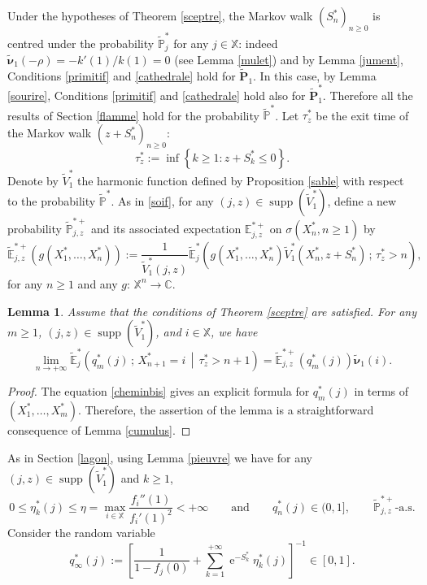 \documentclass[12pt]{amsart}
\newtheorem{lemma}[theorem]{Lemma}
\theoremstyle{definition}
\numberwithin{equation}{section}
\newcommand*{\sachant}[2]{\left.#1 \,\middle|\,#2\right.}
\def\bb#1{\mathbb{#1}}
\def\tt#1{\tilde{#1}}
\def\tbf#1{\tilde{\mathbf{#1}}}
\def\tbs#1{\tilde{\boldsymbol{#1}}}
\def\tbb#1{\tilde{\mathbb{#1}}}
\def\geq{\geqslant}
\def\leq{\leqslant}
\DeclareMathOperator{\e}{e}
\DeclareMathOperator{\supp}{supp}
\begin{document}
Under the hypotheses of Theorem \ref{sceptre}, the Markov walk $( S_n^* )_{n\geq 0}$ is centred under the probability $\tbb P_j^*$ for any $j \in \bb X$: indeed $\tbs \nu_1 (-\rho) = -k'(1)/k(1) = 0$ (see Lemma \ref{mulet}) and by Lemma \ref{jument}, Conditions \ref{primitif} and \ref{cathedrale} hold for $\tbf P_1$. In this case, by Lemma \ref{sourire}, Conditions \ref{primitif} and \ref{cathedrale} hold also for $\tbf P_1^*$. Therefore all the results of Section \ref{flamme} hold for the probability $\tbb P^*$. Let $\tau_z^*$ be the exit time of the Markov walk $( z+S_n^* )_{n\geq 0}$:
\[
\tau_z^* := \inf \left\{ k \geq 1 : z+S_k^* \leq 0 \right\}.
\]
Denote by $\tt V_1^*$ the harmonic function defined by Proposition \ref{sable} with respect to the probability $\tbb P^*$. 
As in \eqref{soif}, for any $(j,z) \in \supp(\tt V_1^*)$, define a new probability $\tbb P_{j,z}^{*+}$ and its associated expectation $\bb E_{j,z}^{*+}$ on $\sigma\left( X_n^*, n \geq 1 \right)$ by
\[
\tbb E_{j,z}^{*+} \left( g \left( X_1^*, \dots, X_n^* \right) \right) := \frac{1}{\tt V_1^*(j,z)} \tbb E_j^* \left( g\left( X_1^*, \dots, X_n^* \right) \tt V_1^*\left( X_n^*, z+S_n^* \right) \,;\, \tau_z^* > n \right),
\]
for any $n \geq 1$ and any $g$: $\bb X^n \to \bb C$.

\begin{lemma} Assume that the conditions of Theorem \ref{sceptre} are satisfied.
\label{jaguar}
For any $m\geq 1$, $(j,z) \in \supp(\tt V_1^*)$, and $i \in \bb X$, we have
\[
\lim_{n\to +\infty} \tbb E_j^* \left( \sachant{ q_m^*(j) \,;\, X_{n+1}^* = i }{ \tau_z^* > n+1 } \right) = \tbb E_{j,z}^{*+} \left( q_m^*(j) \right) \tbs \nu_1 (i).
\]
\end{lemma}

\begin{proof}
The equation \eqref{cheminbis} gives an explicit formula for $q_m^*(j)$ in terms of $\left( X_1^*, \dots, X_m^* \right)$. 
Therefore, the assertion of the lemma is a straightforward consequence of Lemma \ref{cumulus}.
\end{proof}

As in Section \ref{lagon}, using Lemma \ref{pieuvre} we have for any $(j,z) \in \supp(\tt V_1^*)$ and $k \geq 1$,
\begin{equation}
\label{sablier001}
0 \leq \eta_k^*(j) \leq \eta = \max_{i \in \bb X} \frac{f_i''(1)}{f_i'(1)^2} < +\infty \qquad \text{and} \qquad  q_n^*(j) \in (0,1], \qquad \tbb P_{j,z}^{*+}\text{-a.s.}
\end{equation}
Consider the random variable
\begin{equation}
\label{sablier002}
q_{\infty}^*(j) := \left[ \frac{1}{1-f_j(0)} + \sum_{k=1}^{+\infty} \e^{-S_k^*} \eta_k^*(j) \right]^{-1} \in [0,1].
\end{equation}
\end{document}
